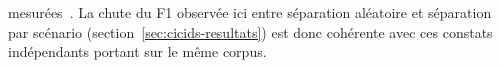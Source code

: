 
\label{sec:cicids-resultats}

mesurées~\cite{engelen2021troubleshooting,lanvin2023errors}. La chute du F1 observée ici entre séparation aléatoire et séparation par scénario (section~\ref{sec:cicids-resultats}) est donc cohérente avec ces constats indépendants portant sur le même corpus.
